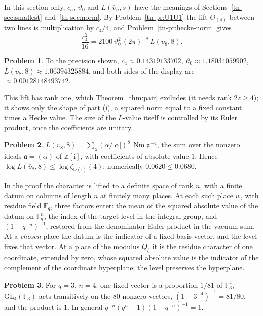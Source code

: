 \documentclass[reqno]{amsart}
\theoremstyle{definition}
\newtheorem{problem}{Problem}[section]
\theoremstyle{plain}
\theoremstyle{remark}
\newcommand{\Z}{\mathbb{Z}}
\newcommand{\Q}{\mathbb{Q}}
\newcommand{\F}{\mathbb{F}}
\newcommand{\ii}{\mathrm{i}}
\newcommand{\Nm}{\operatorname{Nm}}
\begin{document}
In this section only, \(c_a\), \(\vartheta_0\) and \(L(\bar\upsilon_n, s)\) have the meanings of Sections~\ref{tn-sec:smallest} and~\ref{tn-sec:norm}.  By Problem~\ref{tn-pr:U1U1} the lift \(\Theta_{(4)}\) between two lines is multiplication by \(c_4/4\), and Problem~\ref{tn-pr:hecke-norm} gives
\[
  \frac{c_4^2}{16} = 2100\,\vartheta_0^2\,(2\pi)^{-8}\,L(\bar\upsilon_8, 8) .
\]

\begin{problem}\label{pr:gauss}
To the precision shown, \(c_4 \approx 0.14319133702\), \(\vartheta_0 \approx 1.18034059902\), \(L(\bar\upsilon_8, 8) \approx 1.06394325884\), and both sides of the display are \(\approx 0.00128148493742\).
\end{problem}

This lift has rank one, which Theorem~\ref{thm:pair} excludes (it needs rank \(2z \ge 4\)); it shows only the shape of part (i), a squared norm equal to a fixed constant times a Hecke value.  The size of the \(L\)-value itself is controlled by its Euler product, once the coefficients are unitary.

\begin{problem}\label{pr:gauss-euler}
\(L(\bar\upsilon_8, 8) = \sum_{\mathfrak a} (\bar\alpha/\lvert\alpha\rvert)^8\, \Nm\mathfrak a^{-4}\), the sum over the nonzero ideals \(\mathfrak a = (\alpha)\) of \(\Z[\ii]\), with coefficients of absolute value \(1\).  Hence \(\log L(\bar\upsilon_8, 8) \le \log\zeta_{\Q(\ii)}(4)\); numerically \(0.0620 \le 0.0680\).
\end{problem}

In the proof the character is lifted to a definite space of rank \(n\), with a finite datum on columns of length \(n\) at finitely many places.  At each such place \(w\), with residue field \(\F_q\), three factors enter: the mean of the squared absolute value of the datum on \(\F_q^n\), the index of the target level in the integral group, and \((1 - q^{-n})^{-1}\), restored from the denominator Euler product in the vacuum sum.  At a \emph{chosen} place the datum is the indicator of a fixed basis vector, and the level fixes that vector.  At a place of the modulus \(Q_\xi\) it is the residue character of one coordinate, extended by zero, whose squared absolute value is the indicator of the complement of the coordinate hyperplane; the level preserves the hyperplane.

\begin{problem}\label{pr:chosen-place}
For \(q = 3\), \(n = 4\): one fixed vector is a proportion \(1/81\) of \(\F_3^4\), \(\mathrm{GL}_4(\F_3)\) acts transitively on the \(80\) nonzero vectors, \((1 - 3^{-4})^{-1} = 81/80\), and the product is \(1\).  In general \(q^{-n}(q^n - 1)(1 - q^{-n})^{-1} = 1\).
\end{problem}
\end{document}
